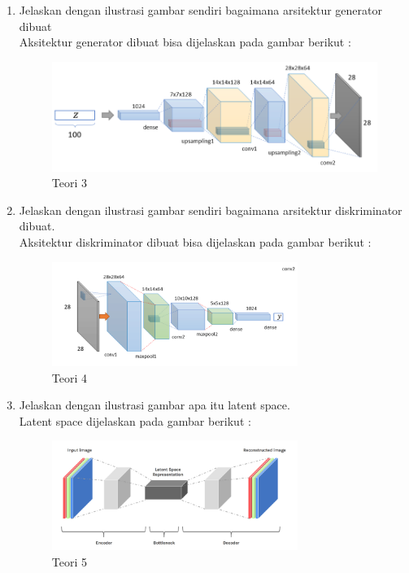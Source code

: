 \begin{enumerate}
\item Jelaskan dengan ilustrasi gambar sendiri bagaimana arsitektur generator dibuat
	\hfill\\
	Aksitektur generator dibuat bisa dijelaskan pada gambar berikut : 

\begin{figure}[H]
    \includegraphics[width=12cm]{figures/1174084/8/teori3.png}
    \centering
    \caption{Teori 3}
\end{figure}

\item Jelaskan dengan ilustrasi gambar sendiri bagaimana arsitektur diskriminator dibuat.
\hfill\\
	Aksitektur diskriminator dibuat bisa dijelaskan pada gambar berikut : 
	
\begin{figure}[H]
    \includegraphics[width=8cm]{figures/1174084/8/teori4.png}
    \centering
    \caption{Teori 4}
\end{figure}

\item Jelaskan dengan ilustrasi gambar apa itu latent space.
	\hfill\\
	Latent space dijelaskan pada gambar berikut :

\begin{figure}[H]
    \includegraphics[width=8cm]{figures/1174084/8/teori5.png}
    \centering
    \caption{Teori 5}
\end{figure}


\end{enumerate}
